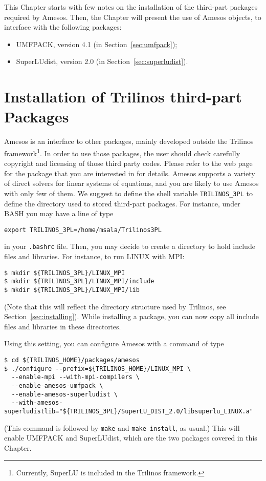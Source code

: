 This Chapter starts with few notes on the installation of the third-part
packages required by Amesos. Then, the Chapter will present the use of
Amesos objects, to interface with the following packages:
\begin{itemize}
\item UMFPACK, version 4.1 (in Section~\ref{sec:umfpack});
\item SuperLUdist, version 2.0 (in Section~\ref{sec:superludist}).
\end{itemize}


\section{Installation of Trilinos third-part Packages}
\label{sec:3pl}

Amesos is an interface to other packages, mainly developed outside the
Trilinos framework\footnote{Currently, SuperLU is included in the
  Trilinos framework.}. In order to use those packages, the user should
check carefully copyright and licensing of those third party codes.
Please refer to the web page for the package that you are interested in
for details. Amesos supports a variety of direct solvers for linear
systems of equations, and you are likely to use Amesos with only few of
them. We suggest to define the shell variable \verb!TRILINOS_3PL!  to
define the directory used to stored third-part packages. For instance,
under BASH you may have a line of type
\begin{verbatim}
export TRILINOS_3PL=/home/msala/Trilinos3PL
\end{verbatim}
in your \verb!.bashrc! file. Then, you may decide to create a directory
to hold include files and libraries. For instance, to run LINUX with
MPI:
\begin{verbatim}
$ mkdir ${TRILINOS_3PL}/LINUX_MPI
$ mkdir ${TRILINOS_3PL}/LINUX_MPI/include
$ mkdir ${TRILINOS_3PL}/LINUX_MPI/lib
\end{verbatim}
(Note that this will reflect the directory structure used by Trilinos,
see Section~\ref{sec:installing}). While installing a package, you can
now copy all include files and libraries in these directories.

Using this setting, you can configure Amesos with a command of type
\begin{verbatim}
$ cd ${TRILINOS_HOME}/packages/amesos
$ ./configure --prefix=${TRILINOS_HOME}/LINUX_MPI \
  --enable-mpi --with-mpi-compilers \
  --enable-amesos-umfpack \
  --enable-amesos-superludist \
  --with-amesos-superludistlib="${TRILINOS_3PL}/SuperLU_DIST_2.0/libsuperlu_LINUX.a"
\end{verbatim}
(This command is followed by \verb!make! and \verb!make install!, as
usual.)  This will enable UMFPACK and SuperLUdist, which are the two
packages covered in this Chapter.

